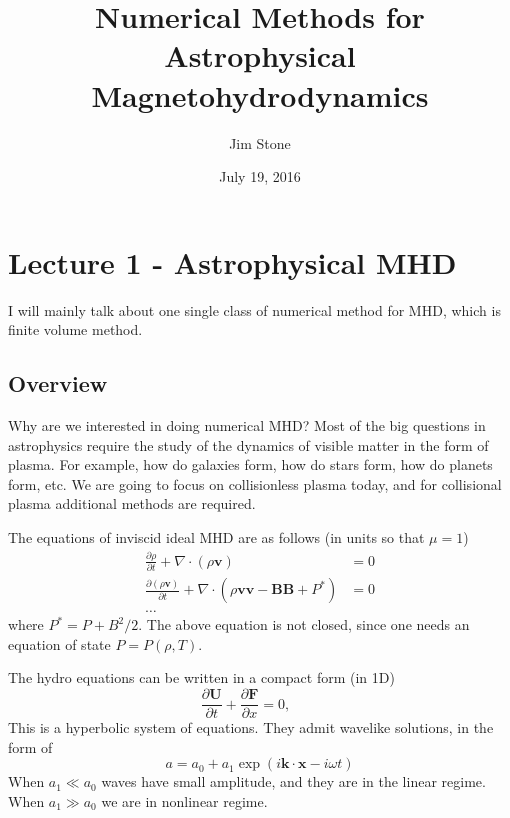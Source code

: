 \documentclass[letterpaper, 11pt]{article}
\numberwithin{equation}{section}
\numberwithin{figure}{section}
\begin{document}
\title{Numerical Methods for Astrophysical Magnetohydrodynamics}
\author{Jim Stone}
\date{July 19, 2016}

\maketitle

\section{Lecture 1 - Astrophysical MHD}

I will mainly talk about one single class of numerical method for MHD, which is
finite volume method.

\subsection{Overview}

Why are we interested in doing numerical MHD? Most of the big questions in
astrophysics require the study of the dynamics of visible matter in the form of
plasma. For example, how do galaxies form, how do stars form, how do planets
form, etc. We are going to focus on collisionless plasma today, and for
collisional plasma additional methods are required.

The equations of inviscid ideal MHD are as follows (in units so that $\mu = 1$)
\begin{align}
  \frac{\partial\rho}{\partial t} + \nabla \cdot \left( \rho \mathbf{v} \right) &= 0 \\
  \frac{\partial(\rho \mathbf{v})}{\partial t} + \nabla \cdot \left( \rho \mathbf{v}\mathbf{v} - \mathbf{B}\mathbf{B} + P^{*} \right) &= 0 \\
  \dots
\end{align}
where $P^{*} = P + B^2/2$. The above equation is not closed, since one needs an
equation of state $P = P(\rho, T)$.

The hydro equations can be written in a compact form (in 1D)
\begin{equation}
  \label{eq:1}
  \frac{\partial \mathbf{U}}{\partial t} + \frac{\partial \mathbf{F}}{\partial x} = 0,\qquad 
\end{equation}
This is a hyperbolic system of equations. They admit wavelike solutions, in the
form of
\begin{equation}
  \label{eq:2}
  a = a_0 + a_1\exp(i\mathbf{k}\cdot \mathbf{x} - i\omega t)
\end{equation}
When $a_1\ll a_0$ waves have small amplitude, and they are in the linear regime.
When $a_1\gg a_0$ we are in nonlinear regime.
\end{document}

